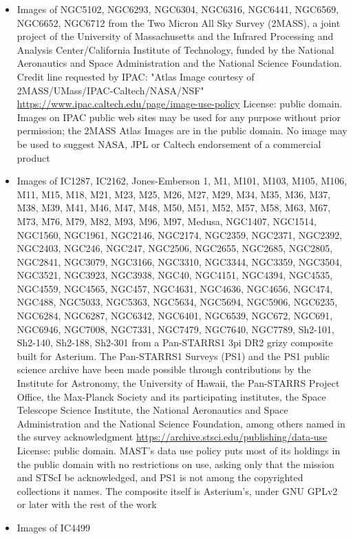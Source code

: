 \begin{itemize}
\item Images of NGC5102, NGC6293, NGC6304, NGC6316, NGC6441, NGC6569, NGC6652,
	 NGC6712
	 from the Two Micron All Sky Survey (2MASS), a joint project of the University of Massachusetts and the Infrared Processing and Analysis Center/California Institute of Technology, funded by the National Aeronautics and Space Administration and the National Science Foundation. Credit line requested by IPAC: "Atlas Image courtesy of 2MASS/UMass/IPAC-Caltech/NASA/NSF"
	 \url{https://www.ipac.caltech.edu/page/image-use-policy}
	 License: public domain. Images on IPAC public web sites may be used for any purpose without prior permission; the 2MASS Atlas Images are in the public domain. No image may be used to suggest NASA, JPL or Caltech endorsement of a commercial product
\item Images of IC1287, IC2162, Jones-Emberson 1, M1, M101, M103, M105, M106, M11, M15,
	 M18, M21, M23, M25, M26, M27, M29, M34, M35, M36, M37, M38, M39,
	 M41, M46, M47, M48, M50, M51, M52, M57, M58, M63, M67, M73, M76,
	 M79, M82, M93, M96, M97, Medusa, NGC1407, NGC1514, NGC1560,
	 NGC1961, NGC2146, NGC2174, NGC2359, NGC2371, NGC2392, NGC2403,
	 NGC246, NGC247, NGC2506, NGC2655, NGC2685, NGC2805, NGC2841,
	 NGC3079, NGC3166, NGC3310, NGC3344, NGC3359, NGC3504, NGC3521,
	 NGC3923, NGC3938, NGC40, NGC4151, NGC4394, NGC4535, NGC4559,
	 NGC4565, NGC457, NGC4631, NGC4636, NGC4656, NGC474, NGC488,
	 NGC5033, NGC5363, NGC5634, NGC5694, NGC5906, NGC6235, NGC6284,
	 NGC6287, NGC6342, NGC6401, NGC6539, NGC672, NGC691, NGC6946,
	 NGC7008, NGC7331, NGC7479, NGC7640, NGC7789, Sh2-101, Sh2-140,
	 Sh2-188, Sh2-301
	 from a Pan-STARRS1 3pi DR2 grizy composite built for Asterium. The Pan-STARRS1 Surveys (PS1) and the PS1 public science archive have been made possible through contributions by the Institute for Astronomy, the University of Hawaii, the Pan-STARRS Project Office, the Max-Planck Society and its participating institutes, the Space Telescope Science Institute, the National Aeronautics and Space Administration and the National Science Foundation, among others named in the survey acknowledgment
	 \url{https://archive.stsci.edu/publishing/data-use}
	 License: public domain. MAST's data use policy puts most of its holdings in the public domain with no restrictions on use, asking only that the mission and STScI be acknowledged, and PS1 is not among the copyrighted collections it names. The composite itself is Asterium's, under GNU GPLv2 or later with the rest of the work
\item Images of IC4499

\end{itemize}
